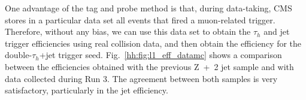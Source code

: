 \documentclass[../main.tex]{subfiles}
\begin{document}
One advantage of the tag and probe method is that, during data-taking, CMS stores in a particular data set all events that fired a muon-related trigger. Therefore, without any bias, we can use this data set to obtain the $\tau_h$ and jet trigger efficiencies using real collision data, and then obtain the efficiency for the double-$\tau_h$+jet trigger seed. Fig.~\ref{hh:fig:l1_eff_datamc} shows a comparison between the efficiencies obtained with the previous Z~+~2 jet sample and with data collected during Run 3. The agreement between both samples is very satisfactory, particularly in the jet efficiency.

\begin{figure}[h!]
\begin{center}
\\

\end{center}
\end{figure}
\end{document}
